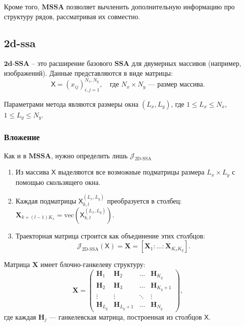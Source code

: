 \documentclass[a4paper, 11pt]{article}
\newcommand{\SSA}{\textbf{SSA}}
\newcommand{\MSSA}{\textbf{MSSA}}
\newcommand{\DSSA}{\textbf{2d-SSA}}
\newcommand{\TS}{\mathsf{X}}
\begin{document}
Кроме того, $\MSSA$ позволяет вычленить дополнительную информацию про структуру рядов, рассматривая их совместно.



\subsection{2d-ssa}

$\DSSA$ -- это расширение базового $\SSA$ для двумерных массивов \cite{ssa_with_R} (например, изображений). Данные представляются в виде матрицы:
\[
	\TS = (x_{ij})_{i,j=1}^{N_x, N_y}, \quad \text{где } N_x \times N_y \text{ — размер массива.}
\]

Параметрами метода являются размеры {окна} $(L_x, L_y)$, где $1 \leq L_x \leq N_x$, $1 \leq L_y \leq N_y$.

\subsubsection{Вложение}

Как и в $\MSSA$, нужно определить лишь $\mathcal{J}_{\text{2D-SSA}}$

\begin{enumerate}
	\item Из массива $\TS$ выделяются {все возможные подматрицы} размера $L_x \times L_y$ с помощью скользящего окна.
	\item Каждая подматрицы $\TS_{k,l}^{(L_x, L_y)}$ преобразуется в столбец: $\mathbf{X}_{k+(l-1)K_x} = \text{vec}(\TS_{k,l}^{(L_x, L_y)})$.
	\item Траекторная матрица строится как объединение этих столбцов:
	      \[
		      \mathcal{J}_{\text{2D-SSA}}(\TS) = \mathbf{X} = [\mathbf{X}_1 : \ldots : \mathbf{X}_{K_x K_y}].
	      \]
\end{enumerate}

Матрица $\mathbf{X}$ имеет {блочно-ганкелеву структуру}:
\[
	\mathbf{X} =
	\begin{pmatrix}
		\mathbf{H}_1     & \mathbf{H}_2       & \ldots & \mathbf{H}_{K_y}   \\
		\mathbf{H}_2     & \mathbf{H}_3       & \ldots & \mathbf{H}_{K_y+1} \\
		\vdots           & \vdots             & \ddots & \vdots             \\
		\mathbf{H}_{L_y} & \mathbf{H}_{L_y+1} & \ldots & \mathbf{H}_{N_y}
	\end{pmatrix},
\]
где каждая $\mathbf{H}_j$ — ганкелевская матрица, построенная из столбцов $\TS$.
\end{document}

